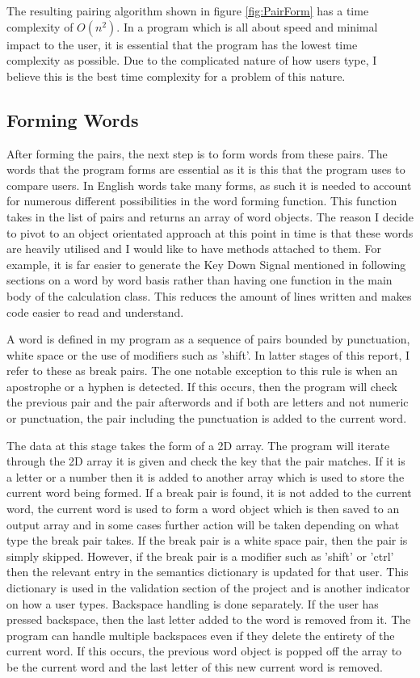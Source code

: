 \documentclass[10pt,a4paper]{report}
\begin{document}
The resulting pairing algorithm shown in figure \ref{fig:PairForm} has a time complexity of \(O(n^2)\). In a program which is all about speed and minimal impact to the user, it is essential that the program has the lowest time complexity as possible. Due to the complicated nature of how users type, I believe this is the best time complexity for a problem of this nature.

\subsection{Forming Words}

After forming the pairs, the next step is to form words from these pairs. The words that the program forms are essential as it is this that the program uses to compare users. In English words take many forms, as such it is needed to account for numerous different possibilities in the word forming function. This function takes in the list of pairs and returns an array of word objects. The reason I decide to pivot to an object orientated approach at this point in time is that these words are heavily utilised and I would like to have methods attached to them. For example, it is far easier to generate the Key Down Signal mentioned in following sections on a word by word basis rather than having one function in the main body of the calculation class. This reduces the amount of lines written and makes code easier to read and understand.

A word is defined in my program as a sequence of pairs bounded by punctuation, white space or the use of modifiers such as 'shift'. In latter stages of this report, I refer to these as break pairs. The one notable exception to this rule is when an apostrophe or a hyphen is detected. If this occurs, then the program will check the previous pair and the pair afterwords and if both are letters and not numeric or punctuation, the pair including the punctuation is added to the current word. 

The data at this stage takes the form of a 2D array. The program will iterate through the 2D array it is given and check the key that the pair matches. If it is a letter or a number then it is added to another array which is used to store the current word being formed. If a break pair is found, it is not added to the current word, the current word is used to form a word object which is then saved to an output array and in some cases further action will be taken depending on what type the break pair takes. If the break pair is a white space pair, then the pair is simply skipped. However, if the break pair is a modifier such as 'shift' or 'ctrl' then the relevant entry in the semantics dictionary is updated for that user. This dictionary is used in the validation section of the project and is another indicator on how a user types. Backspace handling is done separately. If the user has pressed backspace, then the last letter added to the word is removed from it. The program can handle multiple backspaces even if they delete the entirety of the current word. If this occurs, the previous word object is popped off the array to be the current word and the last letter of this new current word is removed.
\end{document}
